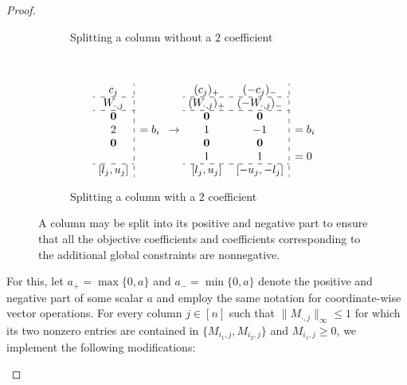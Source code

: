 \documentclass[a4paper,UKenglish,cleveref,thm-restate]{lipics-v2021}
\makeatletter
\newcommand{\veczero}{\mathbf0}
\newenvironment{cdisplaymath}{\@fleqnfalse\begin{displaymath}}{\end{displaymath}}
\makeatother
\begin{document}
\begin{proof}
\begin{claimproof}
\begin{figure}[H]
\begin{subfigure}{0.55\textwidth}
                \caption{Splitting a column without a $2$ coefficient}
                \label{fig:sign-split-normal}
            \end{subfigure}\\
            \begin{subfigure}{0.55\textwidth}
                \begin{cdisplaymath}
                    \begin{array}{c:l}
                        c_j\\
                        \cdashline{1-1}{}
                        W_{\cdot,j}&\\
                        \cdashline{1-1}{}
                        \veczero&\\
                        2&=b_i\\
                        \veczero&\\
                        \\
                        \cdashline{1-1}{}
                        [l_j,u_j]&
                    \end{array}
                    \to
                    \begin{array}{c c:l}
                        (c_j)_+&(-c_j)_-&\\
                        \cdashline{1-2}{}
                        (W_{\cdot,j})_+&(-W_{\cdot,j})_-\\
                        \cdashline{1-2}{}
                        \veczero&\veczero\\
                        1&-1&=b_i\\
                        \veczero&\veczero\\
                        1&1&=0\\
                        \cdashline{1-2}{}
                        [l_j,u_j]&[-u_j,-l_j]&
                    \end{array}
                \end{cdisplaymath}
                \caption{Splitting a column with a $2$ coefficient}
                \label{fig:sign-split-self-loop}
            \end{subfigure}
            \caption{A column may be split into its positive and negative part to ensure that all the objective coefficients and coefficients corresponding to the additional global constraints are nonnegative.}
            \label{fig:sign-split}
        \end{figure}
        For this, let $a_+=\max\{0,a\}$ and $a_-=\min\{0,a\}$ denote the positive and negative part of some scalar $a$ and employ the same notation for coordinate-wise vector operations. For every column $j\in[n]$ such that $\|M_{\cdot,j}\|_\infty\le1$ for which its two nonzero entries are contained in $\{M_{i_1,j},M_{i_2,j}\}$ and $M_{i_1,j}\ge0$, we implement the following modifications:

\end{claimproof}
\end{proof}
\end{document}
